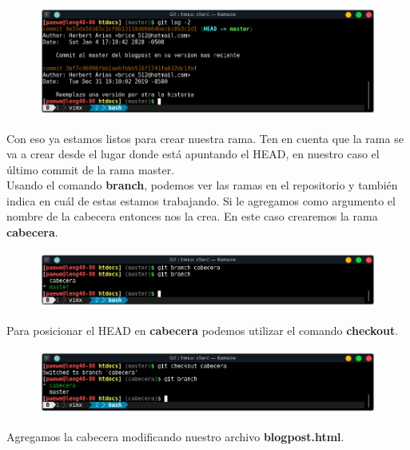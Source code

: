 \documentclass{article}
\begin{document}
\begin{figure}[h!]
  \centering
  \includegraphics[scale=0.75]{./Pictures/135_log_2_lines.png}
\end{figure}

Con eso ya estamos listos para crear nuestra rama. Ten en cuenta que la rama se
va a crear desde el lugar donde está apuntando el HEAD, en nuestro caso el
último commit de la rama master.\\

Usando el comando \textbf{branch}, podemos ver las ramas en el repositorio y
también indica en cuál de estas estamos trabajando. Si le agregamos como
argumento el nombre de la cabecera entonces nos la crea.  En este caso
crearemos la rama \textbf{cabecera}.

\begin{figure}[h!]
  \centering
  \includegraphics[scale=0.75]{./Pictures/136_branch.png}
\end{figure}

Para posicionar el HEAD en \textbf{cabecera} podemos utilizar el comando
\textbf{checkout}.

\begin{figure}[h!]
  \centering
  \includegraphics[scale=0.75]{./Pictures/137_checkout_cabecera.png}
\end{figure}

Agregamos la cabecera modificando nuestro archivo \textbf{blogpost.html}.\\

\newpage
\end{document}
